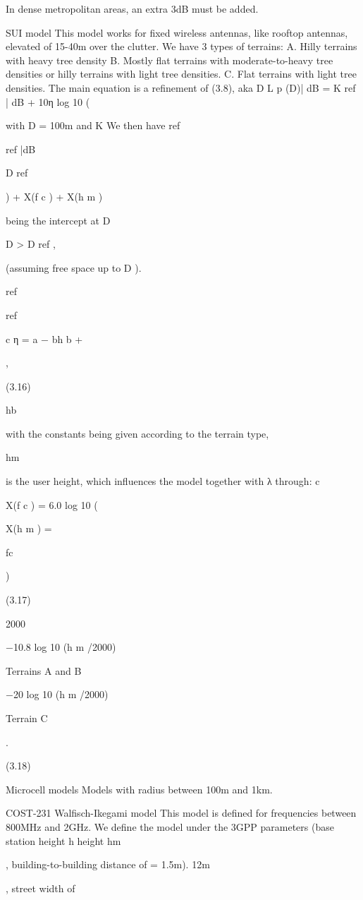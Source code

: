 {{{In dense metropolitan areas, an extra 3dB must be added.

SUI model This model works for fixed wireless antennas, like rooftop antennas, elevated of 15-40m over the clutter.
We have 3 types of terrains:
A. Hilly terrains with heavy tree density B. Mostly flat terrains with moderate-to-heavy tree densities or hilly terrains with light tree densities.
C. Flat terrains with light tree densities.
The main equation is a refinement of (3.8), aka D L p (D)| dB = K ref | dB + 10η log 10 (

with D = 100m and K We then have ref

ref |dB

D ref

) + X(f c ) + X(h m )

being the intercept at D

D > D ref ,

(assuming free space up to D ).

ref

ref

c η = a − bh b +

,

(3.16)

hb

with the constants being given according to the terrain type,

hm

is the user height, which influences the model together with λ through:
c

X(f c ) = 6.0 log 10 (

X(h m ) = {

fc

)

(3.17)

2000

−10.8 log 10 (h m /2000)

Terrains A and B

−20 log 10 (h m /2000)

Terrain C

.

(3.18)

Microcell models Models with radius between 100m and 1km.

COST-231 Walfisch-Ikegami model This model is defined for frequencies between 800MHz and 2GHz.
We define the model under the 3GPP parameters (base station height h height hm

, building-to-building distance of
= 1.5m).
12m

, street width of

}}}}
